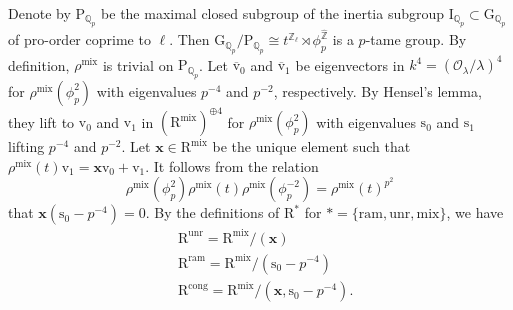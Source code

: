 \documentclass[10pt]{amsart}
\numberwithin{equation}{section}
\theoremstyle{definition}
\def\mix{\mathrm{mix}}
\def\ram{\mathrm{ram}}
\def\calO{\mathcal{O}}
\def\QQ{\mathbb{Q}}
\def\bfx{\mathbf{x}}
\def\ZZ{\mathbb{Z}}
\def\rmv{\mathrm{v}}
\def\rms{\mathrm{s}}
\def\rmG{\mathrm{G}}
\def\rmI{\mathrm{I}}
\def\rmP{\mathrm{P}}
\def\rmR{\mathrm{R}}
\def\unr{\mathrm{unr}}
\begin{document}
Denote by $\rmP_{\QQ_{p}}$ be the maximal closed subgroup of the inertia subgroup $\rmI_{\QQ_{p}}\subset \rmG_{\QQ_{p}}$ of pro-order coprime to $\ell$. Then $\rmG_{\QQ_{p}}/\rmP_{\QQ_{p}}\cong t^{\ZZ_{\ell}}\rtimes \phi^{\widehat{\ZZ}}_{p}$ is a $p$-tame group. By definition, $\rho^{\mix}$ is trivial on $\rmP_{\QQ_{p}}$. Let $\overline{\rmv}_{0}$ and $\overline{\rmv}_{1}$ be eigenvectors in $k^{4}=(\calO_{\lambda}/\lambda)^{4}$ for $\rho^{\mix}(\phi^{2}_{p})$ with eigenvalues $p^{-4}$ and $p^{-2}$, respectively. By Hensel's lemma, they lift to $\rmv_{0}$ and $\rmv_{1}$ in $(\rmR^{\mix})^{\oplus 4}$ for $\rho^{\mix}(\phi^{2}_{p})$ with eigenvalues $\rms_{0}$ and $\rms_{1}$ lifting $p^{-4}$ and $p^{-2}$. Let $\mathbf{x}\in\rmR^{\mix}$ be the unique element such that $\rho^{\mix}(t)\rmv_{1}=\mathbf{x}\rmv_{0}+\rmv_{1}$. It follows from the relation
\begin{equation*}
\rho^{\mix}(\phi^{2}_{p})\rho^{\mix}(t)\rho^{\mix}(\phi^{-2}_{p})=\rho^{\mix}(t)^{p^{2}}
\end{equation*}
that $\mathbf{x}(\rms_{0}-p^{-4})=0$. By the definitions of $\rmR^{\ast}$ for $\ast=\{\ram, \unr, \mix\}$, we have
\begin{equation*}
\begin{aligned}
&\rmR^{\unr}=\rmR^{\mix}/(\bfx)\\
&\rmR^{\ram}=\rmR^{\mix}/(\rms_{0}-p^{-4})\\
&\rmR^{\mathrm{cong}}=\rmR^{\mix}/(\bfx, \rms_{0}-p^{-4}).\\
\end{aligned}
\end{equation*}
\end{document}
